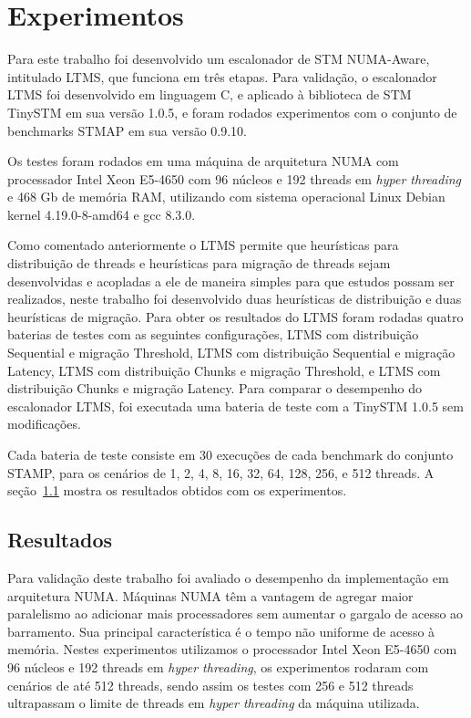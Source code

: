 \documentclass[diss,capa]{texufpel}
\begin{document}



\chapter{Experimentos}
\label{chapter::experimentos}

Para este trabalho foi desenvolvido um escalonador de STM NUMA-Aware, intitulado LTMS, que funciona em três etapas. Para validação, o escalonador LTMS foi desenvolvido em linguagem C, e aplicado à biblioteca de STM TinySTM em sua versão 1.0.5, e foram rodados experimentos com o conjunto de benchmarks STMAP em sua versão 0.9.10.

Os testes foram rodados em uma máquina de arquitetura NUMA com processador Intel Xeon E5-4650 com 96 núcleos e 192 threads em \emph{hyper threading} e 468 Gb de memória RAM, utilizando com sistema operacional Linux Debian kernel 4.19.0-8-amd64  e gcc 8.3.0.

Como comentado anteriormente o LTMS permite que heurísticas para distribuição de threads e heurísticas para migração de threads sejam desenvolvidas e acopladas a ele de maneira simples para que estudos possam ser realizados, neste trabalho foi desenvolvido duas heurísticas de distribuição e duas heurísticas de migração. Para obter os resultados do LTMS foram rodadas quatro baterias de testes com as seguintes configurações, LTMS com distribuição Sequential e migração Threshold, LTMS com distribuição Sequential e migração Latency, LTMS com distribuição Chunks e migração Threshold, e LTMS com distribuição Chunks e migração Latency. Para comparar o desempenho do escalonador LTMS, foi executada uma bateria de teste com a TinySTM 1.0.5 sem modificações.

Cada bateria de teste consiste em 30 execuções de cada benchmark do conjunto STAMP, para os cenários de 1, 2, 4, 8, 16, 32, 64, 128, 256, e 512 threads. A seção~\ref{resultados} mostra os resultados obtidos com os experimentos.

\section{Resultados}
\label{resultados}

Para validação deste trabalho foi avaliado o desempenho da implementação em arquitetura NUMA. Máquinas NUMA têm a vantagem de agregar maior paralelismo ao adicionar mais processadores sem aumentar o gargalo de acesso ao barramento. Sua principal característica é o tempo não uniforme de acesso à memória. Nestes experimentos utilizamos o processador Intel Xeon E5-4650 com 96 núcleos e 192 threads em \emph{hyper threading}, os experimentos rodaram com cenários de até 512 threads, sendo assim os testes com 256 e 512 threads ultrapassam o limite de threads em \emph{hyper threading} da máquina utilizada.
\end{document}

